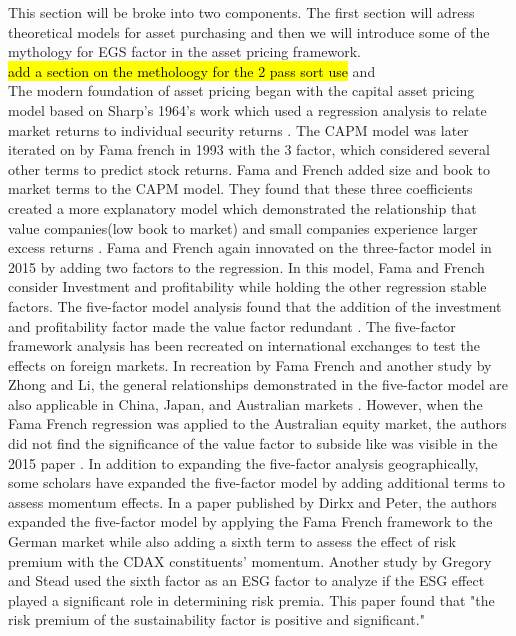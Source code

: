 This section will be broke into two components. The first section will adress  theoretical models for asset purchasing and then we will introduce some of the mythology for  EGS factor in the asset pricing framework.\\


 \hl{add a section on the metholoogy for the 2 pass sort use} \cite{Kleibergen2013UnexplainedFA} and \cite{Fama1973RiskRA} \\
The modern foundation of asset pricing began with the capital asset pricing model based on Sharp's 1964's work which used a regression analysis to relate market returns to individual security returns \cite{Sharpe1964CAPITALAP}. The CAPM model was later iterated on by Fama french in 1993 with the 3 factor, which considered several other terms to predict stock returns. Fama and French added size and book to market terms to the CAPM model. They found that these three coefficients created a more explanatory model which demonstrated the relationship that value companies(low book to market) and small companies experience larger excess returns \cite{Fama1992TheCO}. Fama and French again innovated on the three-factor model in 2015 by adding two factors to the regression. In this model, Fama and French consider Investment and profitability while holding the other regression stable factors. The five-factor model analysis found that the addition of the investment and profitability factor made the value factor redundant \cite{Fama2013AFA}. The five-factor framework analysis has been recreated on international exchanges to test the effects on foreign markets. In recreation by Fama French and another study by Zhong and Li, the general relationships demonstrated in the five-factor model are also applicable in China, Japan, and Australian markets \cite{Fama2015InternationalTO, LIN2017141, Chiah2016A}. However, when the Fama French regression was applied to the Australian equity market, the authors did not find the significance of the value factor to subside like was visible in the 2015 paper \cite{Chiah2016A}.  In addition to expanding the five-factor analysis geographically, some scholars have expanded the five-factor model by adding additional terms to assess momentum effects.  In a paper published by  Dirkx and  Peter, the authors expanded the five-factor model by applying the Fama French framework to the German market while also adding a sixth term to assess the effect of risk premium with the CDAX constituents' momentum. Another study by Gregory and Stead used the sixth factor as an ESG factor to analyze if the ESG effect played a significant role in determining risk premia. This paper found that  "the risk premium of the sustainability factor is positive and significant\cite{Gregory2020TheGP}."

